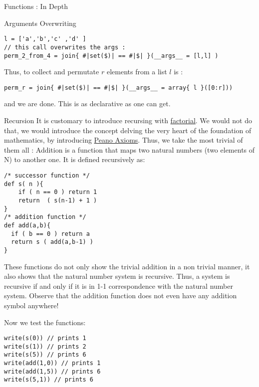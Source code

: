 \begin{section}{Functions : In Depth}
\begin{subsection}{Arguments Overwriting}
\begin{lstlisting}[style=JexlStyle]
l = ['a','b','c' ,'d' ]
// this call overwrites the args :
perm_2_from_4 = join{ #|set($)| == #|$| }(__args__ = [l,l] )
\end{lstlisting}

Thus, to collect and permutate $r$ elements from a list $l$ is :
 
\begin{lstlisting}[style=JexlStyle]
perm_r = join{ #|set($)| == #|$| }(__args__ = array{ l }([0:r]))
\end{lstlisting}

and we are done. This is as declarative as one can get.

\end{subsection}

\begin{subsection}{Recursion}
It is customary to introduce recursing with \href{https://en.wikipedia.org/wiki/Factorial}{factorial}.
We would not do that, we would introduce the concept delving the very heart of the foundation of mathematics, 
by introducing \href{https://en.wikipedia.org/wiki/Peano_axioms}{Peano Axioms}.
Thus, we take the most trivial of them all : Addition is a function that maps two natural numbers (two elements of N) to another one. 
It is defined recursively as:

\begin{lstlisting}[style=JexlStyle]
/* successor function */
def s( n ){
    if ( n == 0 ) return 1 
    return  ( s(n-1) + 1 )  
}
/* addition function */
def add(a,b){
  if ( b == 0 ) return a
  return s ( add(a,b-1) )
}
\end{lstlisting}

These functions do not only show the trivial addition in a non trivial manner, 
it also shows that the natural number system is recursive.
Thus, a system is recursive if and only if it is in 1-1 correspondence with the natural number system.
Observe that the addition function does not even have any addition symbol anywhere!

Now we test the functions:

\begin{center}\begin{minipage}{\linewidth}
\begin{lstlisting}[style=JexlStyle]
write(s(0)) // prints 1 
write(s(1)) // prints 2
write(s(5)) // prints 6
write(add(1,0)) // prints 1
write(add(1,5)) // prints 6
write(s(5,1)) // prints 6
\end{lstlisting}
\end{minipage}\end{center}


\end{subsection}
\end{section}
